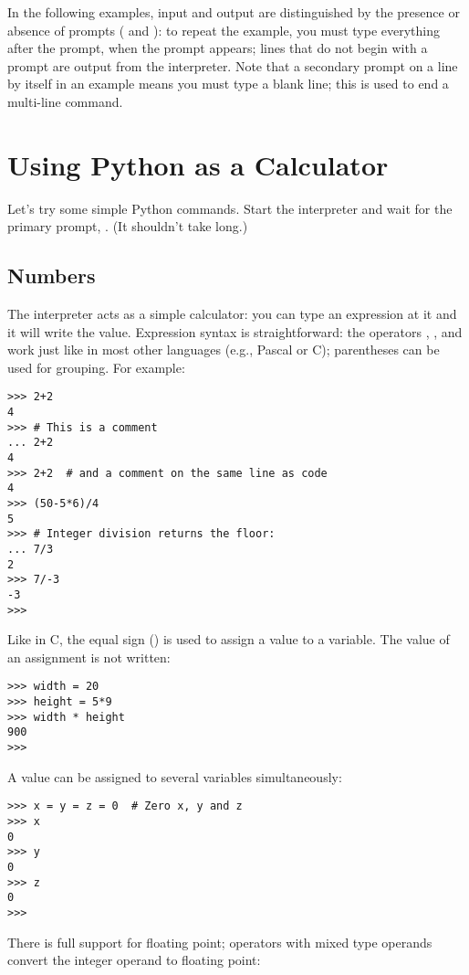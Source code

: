 In the following examples, input and output are distinguished by the
presence or absence of prompts (\code{>>>} and ): to repeat
the example, you must type everything after the prompt, when the
prompt appears; lines that do not begin with a prompt are output from
the interpreter.%
Note that a secondary prompt on a line by itself in an example means
you must type a blank line; this is used to end a multi-line command.

\section{Using Python as a Calculator}

Let's try some simple Python commands.  Start the interpreter and wait
for the primary prompt, \code{>>>}.  (It shouldn't take long.)

\subsection{Numbers}

The interpreter acts as a simple calculator: you can type an
expression at it and it will write the value.  Expression syntax is
straightforward: the operators \code{+}, \code{-}, \code{*} and \code{/}
work just like in most other languages (e.g., Pascal or C); parentheses
can be used for grouping.  For example:

\bcode\begin{verbatim}
>>> 2+2
4
>>> # This is a comment
... 2+2
4
>>> 2+2  # and a comment on the same line as code
4
>>> (50-5*6)/4
5
>>> # Integer division returns the floor:
... 7/3
2
>>> 7/-3
-3
>>> 
\end{verbatim}\ecode
%
Like in C, the equal sign (\code{=}) is used to assign a value to a
variable.  The value of an assignment is not written:

\bcode\begin{verbatim}
>>> width = 20
>>> height = 5*9
>>> width * height
900
>>> 
\end{verbatim}\ecode
%
A value can be assigned to several variables simultaneously:

\bcode\begin{verbatim}
>>> x = y = z = 0  # Zero x, y and z
>>> x
0
>>> y
0
>>> z
0
>>> 
\end{verbatim}\ecode
%
There is full support for floating point; operators with mixed type
operands convert the integer operand to floating point:

